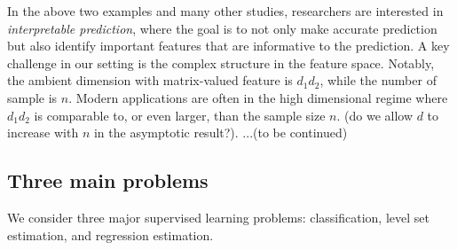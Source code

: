 \documentclass[12pt]{article}
\begin{document}
In the above two examples and many other studies, researchers are interested in \emph{interpretable prediction}, where the goal is to not only make accurate prediction but also identify important features that are informative to the prediction. A key challenge in our setting is the complex structure in the feature space. Notably, the ambient dimension with matrix-valued feature is $d_1d_2$, while the number of sample is $n$. Modern applications are often in the high dimensional regime where $d_1d_2$ is comparable to, or even larger, than the sample size $n$. (do we allow $d$ to increase with $n$ in the asymptotic result?). ...(to be continued)

\subsection{Three main problems}
We consider three major supervised learning problems: classification, level set estimation, and regression estimation.
\end{document}
